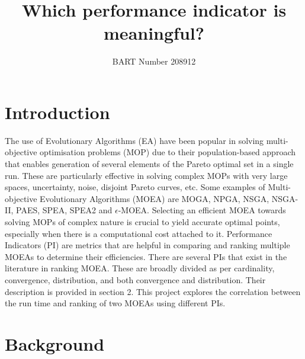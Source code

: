 \documentclass[sigconf,nonacm]{acmart}
\begin{document}
\title[Short title]{Which performance indicator is meaningful?}
\author{BART Number 208912}

\begin{abstract}
	
\end{abstract}

\maketitle

\section{Introduction}
The use of Evolutionary Algorithms (EA) have been popular in solving multi-objective optimisation problems (MOP) due to their population-based approach that enables generation of several elements of the Pareto optimal set in a single run. These are particularly effective in solving complex MOPs with very large spaces, uncertainty, noise, disjoint Pareto curves, etc. Some examples of Multi-objective Evolutionary Algorithms (MOEA) are MOGA, NPGA, NSGA, NSGA-II, PAES, SPEA, SPEA2 and $\epsilon$-MOEA\cite{moea2007, deb2002}. Selecting an efficient MOEA towards solving MOPs of complex nature is crucial to yield accurate optimal points, especially when there is a computational cost attached to it. Performance Indicators (PI) are metrics that are helpful in comparing and ranking multiple MOEAs to determine their efficiencies. There are several PIs that exist in the literature in ranking MOEA. These are broadly divided as per cardinality, convergence, distribution, and both convergence and distribution. Their description is provided in section 2. This project explores the correlation between the run time and ranking of two MOEAs using different PIs.

\balance

\section{Background}
\end{document}
